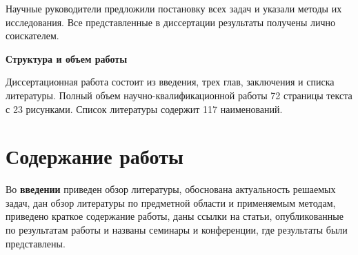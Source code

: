 Научные руководители предложили постановку всех задач и указали методы их исследования. Все представленные в диссертации результаты получены лично соискателем. 

\textbf{Структура и объем работы}

Диссертационная работа состоит из введения, трех глав, заключения и списка литературы. Полный объем научно-квалификационной работы 72 страницы текста с 23 рисунками. Список литературы содержит 117 наименований.

\section*{Содержание работы}

Во \textbf{введении} приведен обзор литературы, обоснована актуальность решаемых задач, дан обзор литературы по предметной области и применяемым методам, приведено краткое содержание работы, даны ссылки на статьи, опубликованные по результатам работы и названы семинары и конференции, где результаты были представлены.

